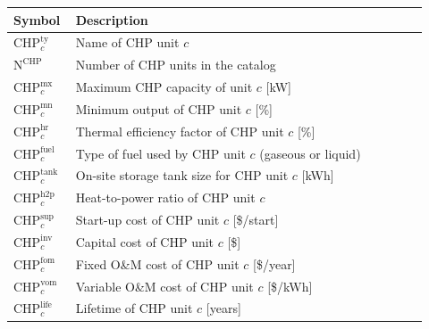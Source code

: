 \documentclass[11pt]{article}
\begin{document}
\begin{center}
\centering
\begin{tabular}{p{0.12\linewidth}p{0.8\linewidth}}
\hline
\textbf{Symbol} & \textbf{Description} \\
\hline
\(\text{CHP}^\text{ty}_c\) & Name of CHP unit \(c\) \\
\(\text{N}^\text{CHP}\) & Number of CHP units in the catalog \\
\(\text{CHP}^\text{mx}_c\) & Maximum CHP capacity of unit \(c\) [kW] \\
\(\text{CHP}^\text{mn}_c\) & Minimum output of CHP unit \(c\) [\%] \\
\(\text{CHP}^\text{hr}_c\) & Thermal efficiency factor of CHP unit \(c\) [\%] \\
\(\text{CHP}^\text{fuel}_c\) & Type of fuel used by CHP unit \(c\) (gaseous or liquid) \\
\(\text{CHP}^\text{tank}_c\) & On-site storage tank size for CHP unit \(c\) [kWh] \\
\(\text{CHP}^\text{h2p}_c\) & Heat-to-power ratio of CHP unit \(c\) \\
\(\text{CHP}^\text{sup}_c\) & Start-up cost of CHP unit \(c\) [\$/start] \\
\(\text{CHP}^\text{inv}_c\) & Capital cost of CHP unit \(c\) [\$] \\
\(\text{CHP}^\text{fom}_c\) & Fixed O\&M cost of CHP unit \(c\) [\$/year] \\
\(\text{CHP}^\text{vom}_c\) & Variable O\&M cost of CHP unit \(c\) [\$/kWh] \\
\(\text{CHP}^\text{life}_c\) & Lifetime of CHP unit \(c\) [years] \\
\hline
\end{tabular}
\captionsetup{type=table}
\label{tab:chp_parameters}
\end{center}
\end{document}
